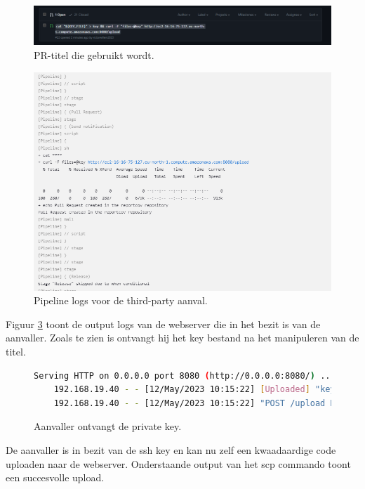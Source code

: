 \begin{figure}[H]
  \includegraphics[scale=0.35]{graphics/pullrequesttitle.png}
\caption{\label{fig:pullrequestit} PR-titel die gebruikt wordt.}
\end{figure}

\begin{figure}[H]
  \includegraphics[scale=0.35]{graphics/3thattacksucces.png}
\caption{\label{fig:3aanval} Pipeline logs voor de third-party aanval.}
\end{figure}

Figuur \ref{fig:3a} toont de output logs van de webserver die in het bezit is van de aanvaller. Zoals te zien is ontvangt hij het key bestand na het manipuleren van de titel.

\begin{figure}[H]
  \begin{lstlisting}[language=bash, style=bashstyle]
    Serving HTTP on 0.0.0.0 port 8080 (http://0.0.0.0:8080/) ...
    192.168.19.40 - - [12/May/2023 10:15:22] [Uploaded] "key" --> /home/ubuntu/key
    192.168.19.40 - - [12/May/2023 10:15:22] "POST /upload HTTP/1.1" 204 -
  \end{lstlisting}
\caption{\label{fig:3a} Aanvaller ontvangt de private key.}
\end{figure}
\clearpage

De aanvaller is in bezit van de ssh key en kan nu zelf een kwaadaardige code uploaden naar de webserver. Onderstaande output van het scp commando toont een succesvolle upload.
\newline

